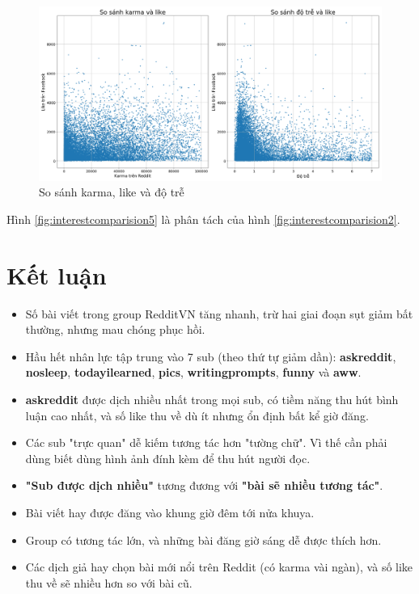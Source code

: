 \documentclass[10pt,a4paper]{article}
\begin{document}
\FloatBarrier
\begin{figure}[!ht]
    \centering
    \includegraphics[width=\textwidth]{img/InterestComparision2.png}
    \caption{So sánh karma, like và độ trễ}
    \label{fig:interestcomparision5}
\end{figure}

Hình \eqref{fig:interestcomparision5} là phân tách của hình \eqref{fig:interestcomparision2}.

\section{Kết luận}
\begin{itemize}
    \item Số bài viết trong group RedditVN tăng nhanh, trừ hai giai đoạn sụt giảm bất thường, nhưng mau chóng phục hồi.
    \item Hầu hết nhân lực tập trung vào 7 sub (theo thứ tự giảm dần): \textbf{askreddit}, \textbf{nosleep}, \textbf{todayilearned}, \textbf{pics}, \textbf{writingprompts}, \textbf{funny} và \textbf{aww}.
    \item \textbf{askreddit} được dịch nhiều nhất trong mọi sub, có tiềm năng thu hút bình luận cao nhất, và số like thu về dù ít nhưng ổn định bất kể giờ đăng.
    \item Các sub "trực quan" dễ kiếm tương tác hơn "tường chữ". Vì thế cần phải dùng biết dùng hình ảnh đính kèm để thu hút người đọc.
    \item \textbf{"Sub được dịch nhiều"} tương đương với \textbf{"bài sẽ nhiều tương tác"}.
    \item Bài viết hay được đăng vào khung giờ đêm tới nửa khuya.
    \item Group có tương tác lớn, và những bài đăng giờ sáng dễ được thích hơn.
    \item Các dịch giả hay chọn bài mới nổi trên Reddit (có karma vài ngàn), và số like thu về sẽ nhiều hơn so với bài cũ.
\end{itemize}
\end{document}
